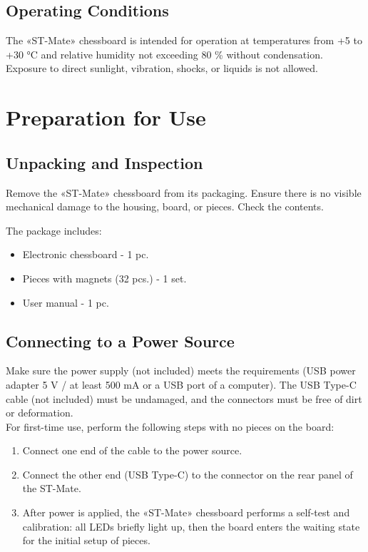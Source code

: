 \documentclass[a4paper,12pt]{article}
\begin{document}
\subsection{Operating Conditions}
The «ST-Mate» chessboard is intended for operation at temperatures from +5 to +30 °C and relative humidity not exceeding 80 \% without condensation.
Exposure to direct sunlight, vibration, shocks, or liquids is not allowed.

\section{Preparation for Use}
\label{sec:preparation}

\subsection{Unpacking and Inspection}
Remove the «ST-Mate» chessboard from its packaging.
Ensure there is no visible mechanical damage to the housing, board, or pieces.
Check the contents.

The package includes:
\begin{itemize}
    \item Electronic chessboard - 1 pc.
    \item Pieces with magnets (32 pcs.) - 1 set.
    \item User manual - 1 pc.
\end{itemize}

\subsection{Connecting to a Power Source}
Make sure the power supply (not included) meets the requirements (USB power adapter 5 V / at least 500 mA or a USB port of a computer).
The USB Type-C cable (not included) must be undamaged, and the connectors must be free of dirt or deformation.\\
For first-time use, perform the following steps with no pieces on the board:
\begin{enumerate}
    \item Connect one end of the cable to the power source.
    \item Connect the other end (USB Type-C) to the connector on the rear panel of the ST-Mate.
    \item After power is applied, the «ST-Mate» chessboard performs a self-test and calibration: all LEDs briefly light up, then the board enters the waiting state for the initial setup of pieces.
\end{enumerate}
\end{document}
